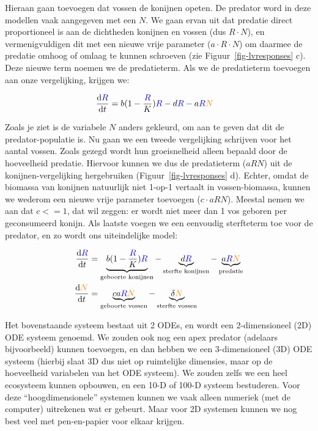 \documentclass[
  a4paper,
]{scrbook}
\theoremstyle{definition}
\theoremstyle{remark}
\begin{document}
Hieraan gaan toevoegen dat vossen de konijnen opeten. De {predator} word
in deze modellen vaak aangegeven met een \(N\). We gaan ervan uit dat
predatie direct proportioneel is aan de dichtheden konijnen en vossen
(dus \(R\cdot N\)), en vermenigvuldigen dit met een nieuwe vrije
parameter (\(a \cdot R\cdot N\)) om daarmee de predatie omhoog of omlaag
te kunnen schroeven (zie Figuur~\ref{fig-lvresponses} c). Deze nieuwe
term noemen we de predatieterm. Als we de predatieterm toevoegen aan
onze vergelijking, krijgen we:

\begin{align*}
  \color{black}\frac{\mathrm{d}\color{blue}R}{\mathrm{d}t} &\color{black}= b(1-\frac{\color{blue}R}{K})\color{blue}R\color{black} - d\color{blue}R - \color{black}a\color{blue}R\color{orange}N
\end{align*}

Zoals je ziet is de variabele \(N\) anders gekleurd, om aan te geven dat
dit de {predator}-populatie is. Nu gaan we een tweede vergelijking
schrijven voor het aantal vossen. Zoals gezegd wordt hun groeisnelheid
alleen bepaald door de hoeveelheid predatie. Hiervoor kunnen we dus de
predatieterm (\(aRN\)) uit de konijnen-vergelijking hergebruiken
(Figuur~\ref{fig-lvresponses} d). Echter, omdat de biomassa van konijnen
natuurlijk niet 1-op-1 vertaalt in vossen-biomassa, kunnen we wederom
een nieuwe vrije parameter toevoegen (\(c \cdot aRN\)). Meestal nemen we
aan dat \(c<=1\), dat wil zeggen: er wordt niet meer dan 1 vos geboren
per geconsumeerd konijn. Als laatste voegen we een eenvoudig sterfteterm
toe voor de predator, en zo wordt ons uiteindelijke model:

\begin{align*}
    \color{black}\frac{\mathrm{d}\color{blue}R}{\mathrm{d}t} &\color{black}= \underbrace{b(1-\frac{\color{blue}R}{K})\color{blue}R\color{black}}_{\text{geboorte konijnen}} - 
\underbrace{d\color{blue}R}_{\text{sterfte konijnen}} - \underbrace{\color{black}a\color{blue}R\color{orange}N\color{black}}_{\text{predatie}}\\
\color{black}\frac{\mathrm{d}\color{orange}N}{\mathrm{d}t} &\color{black}= \underbrace{\color{black}ca\color{blue}R\color{orange}N\color{black}}_{\text{geboorte vossen}}\color{black} - \underbrace{\delta \color{orange}N\color{black}}_{\text{sterfte vossen}}
\end{align*}

Het bovenstaande systeem bestaat uit 2 ODEs, en wordt een 2-dimensioneel
(2D) ODE systeem genoemd. We zouden ook nog een apex predator (adelaars
bijvoorbeeld) kunnen toevoegen, en dan hebben we een 3-dimensioneel (3D)
ODE systeem (hierbij slaat 3D dus niet op ruimtelijke dimensies, maar op
de hoeveelheid variabelen van het ODE systeem). We zouden zelfs we een
heel ecosysteem kunnen opbouwen, en een 10-D of 100-D systeem
bestuderen. Voor deze ``hoogdimensionele'' systemen kunnen we vaak
alleen numeriek (met de computer) uitrekenen wat er gebeurt. Maar voor
2D systemen kunnen we nog best veel met pen-en-papier voor elkaar
krijgen.
\end{document}
